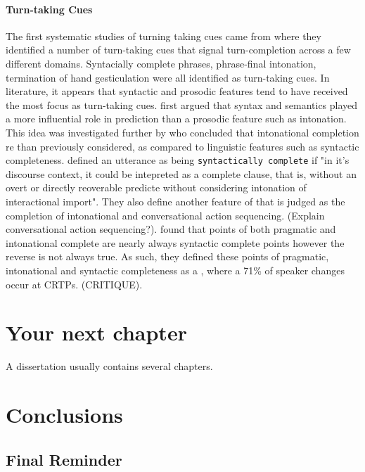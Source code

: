 \documentclass[logo,bsc,singlespacing,parskip]{infthesis}
\begin{document}
\subsubsection{Turn-taking Cues} 
The first systematic studies of turning taking cues came from \cite{Duncan1972, Duncan1974} where they identified a number of turn-taking cues that signal turn-completion across a few different domains. Syntacially complete phrases, phrase-final intonation, termination of hand gesticulation were all identified as turn-taking cues. In literature, it appears that syntactic and prosodic features tend to have received the most focus as turn-taking cues. \cite{Sacks1974} first argued that syntax and semantics played a more influential role in prediction than a prosodic feature such as intonation. This idea was investigated further by \cite{Ford1996} who concluded that intonational completion
re than previously considered, as compared to linguistic features such as syntactic completeness. \cite{Ford1996} defined an utterance as being \texttt{syntactically complete} if "in it's discourse context, it could be intepreted as a complete clause, that is, without an overt or directly reoverable predicte without considering intonation of interactional import". They also define another feature of  that is judged as the completion of intonational and conversational action sequencing. (Explain conversational action sequencing?). \cite{Ford1996} found that points of both pragmatic and intonational complete are nearly always syntactic complete points however the reverse is not always true. As such, they defined these points of pragmatic, intonational and syntactic completeness as a , where a 71\% of speaker changes occur at CRTPs. (CRITIQUE). \cite{Ford1996} 


\chapter{Your next chapter}

A dissertation usually contains several chapters.

\chapter{Conclusions}

\section{Final Reminder}
\end{document}
